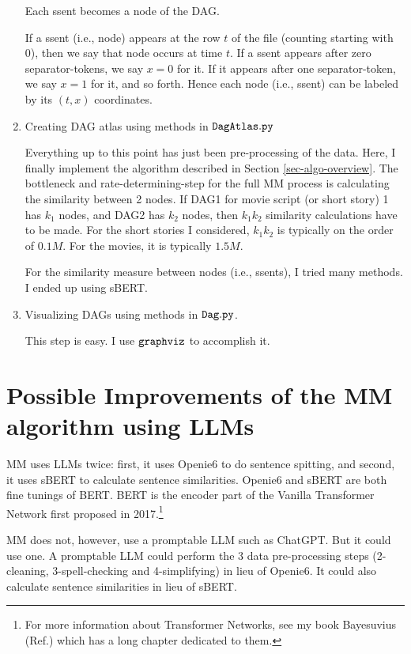\documentclass[12pt]{article}
\begin{document}
\begin{enumerate}
Each ssent becomes a node of the DAG.

If  a ssent (i.e., node) appears at the
row $t$ of the file (counting starting with 0), then 
we say that node occurs at time $t$. If a ssent appears after zero separator-tokens, we say $x=0$ for it.
If it appears after one separator-token, we say $x=1$ for it, and so forth. Hence each node (i.e., ssent)
can be labeled by its $(t,x)$ coordinates.


\item Creating DAG atlas using methods in
$\tt DagAtlas.py$

Everything up to this point has just been
pre-processing of the data. 
Here, I finally implement the algorithm described
in Section \ref{sec-algo-overview}.
The bottleneck and rate-determining-step for
the full MM process is
calculating the similarity between 2 nodes.
If DAG1 for movie script (or short story) 1 has $k_1$ 
nodes, and DAG2 has $k_2$ nodes,
then $k_1 k_2$ similarity calculations have to be made.
For the short stories I considered, $k_1k_2$
is typically on the order of $0.1M$.
For the movies, it is typically $1.5M$.

For the similarity measure between nodes (i.e., ssents), I tried 
many methods. I
ended up using sBERT. 

\item Visualizing DAGs using methods in $\tt Dag.py$.

This step is easy. I use $\tt graphviz$ to 
accomplish it.

\end{enumerate}

\section{Possible Improvements
of the MM algorithm
using LLMs}

MM uses 
LLMs twice: first, 
it uses Openie6
to do sentence spitting,
and second, it uses 
sBERT to calculate sentence
similarities.
Openie6 and sBERT are both
fine tunings of BERT.
BERT is the encoder 
part of the Vanilla Transformer
Network
first proposed in 2017.\footnote{For more information about Transformer Networks,
see my book Bayesuvius (Ref.\cite{bayesuvius}) which
has a long chapter dedicated
to them.}


MM does not, however, use 
a promptable LLM such as
ChatGPT. But it could use one.
A promptable
LLM could perform
the 3 data pre-processing steps
(2-cleaning, 3-spell-checking and 4-simplifying) in lieu of 
Openie6. It could also calculate sentence similarities in lieu of sBERT.
\end{document}
